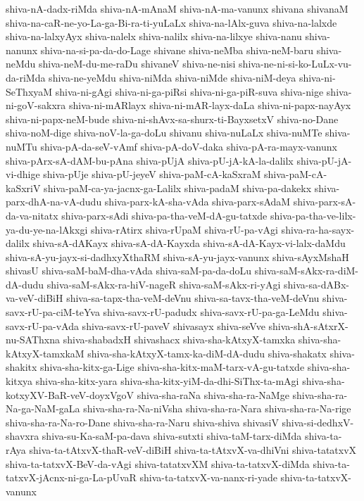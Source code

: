 {shiva-nA-dadx-riMda
shiva-nA-mAnaM
shiva-nA-ma-vanunx
shivana
shivanaM
shiva-na-caR-ne-yo-La-ga-Bi-ra-ti-yuLaLx
shiva-na-lAlx-guva
shiva-na-lalxde
shiva-na-lalxyAyx
shiva-nalelx
shiva-nalilx
shiva-na-lilxye
shiva-nanu
shiva-nanunx
shiva-na-si-pa-da-do-Lage
shivane
shiva-neMba
shiva-neM-baru
shiva-neMdu
shiva-neM-du-me-raDu
shivaneV
shiva-ne-nisi
shiva-ne-ni-si-ko-LuLx-vu-da-riMda
shiva-ne-yeMdu
shiva-niMda
shiva-niMde
shiva-niM-deya
shiva-ni-SeThxyaM
shiva-ni-gAgi
shiva-ni-ga-piRsi
shiva-ni-ga-piR-suva
shiva-nige
shiva-ni-goV-sakxra
shiva-ni-mARlayx
shiva-ni-mAR-layx-daLa
shiva-ni-papx-nayAyx
shiva-ni-papx-neM-bude
shiva-ni-shAvx-sa-shurx-ti-BayxsetxV
shiva-no-Dane
shiva-noM-dige
shiva-noV-la-ga-doLu
shivanu
shiva-nuLaLx
shiva-nuMTe
shiva-nuMTu
shiva-pA-da-seV-vAmf
shiva-pA-doV-daka
shiva-pA-ra-mayx-vanunx
shiva-pArx-sA-dAM-bu-pAna
shiva-pUjA
shiva-pU-jA-kA-la-dalilx
shiva-pU-jA-vi-dhige
shiva-pUje
shiva-pU-jeyeV
shiva-paM-cA-kaSxraM
shiva-paM-cA-kaSxriV
shiva-paM-ca-ya-jacnx-ga-Lalilx
shiva-padaM
shiva-pa-dakekx
shiva-parx-dhA-na-vA-dudu
shiva-parx-kA-sha-vAda
shiva-parx-sAdaM
shiva-parx-sA-da-va-nitatx
shiva-parx-sAdi
shiva-pa-tha-veM-dA-gu-tatxde
shiva-pa-tha-ve-lilx-ya-du-ye-na-lAkxgi
shiva-rAtirx
shiva-rUpaM
shiva-rU-pa-vAgi
shiva-ra-ha-sayx-dalilx
shiva-sA-dAKayx
shiva-sA-dA-Kayxda
shiva-sA-dA-Kayx-vi-lalx-daMdu
shiva-sA-yu-jayx-si-dadhxyXthaRM
shiva-sA-yu-jayx-vanunx
shiva-sAyxMshaH
shivasU
shiva-saM-baM-dha-vAda
shiva-saM-pa-da-doLu
shiva-saM-sAkx-ra-diM-dA-dudu
shiva-saM-sAkx-ra-hiV-nageR
shiva-saM-sAkx-ri-yAgi
shiva-sa-dABx-va-veV-diBiH
shiva-sa-tapx-tha-veM-deVnu
shiva-sa-tavx-tha-veM-deVnu
shiva-savx-rU-pa-ciM-teYva
shiva-savx-rU-padudx
shiva-savx-rU-pa-ga-LeMdu
shiva-savx-rU-pa-vAda
shiva-savx-rU-paveV
shivasayx
shiva-seVve
shiva-shA-sAtxrX-nu-SAThxna
shiva-shabadxH
shivashacx
shiva-sha-kAtxyX-tamxka
shiva-sha-kAtxyX-tamxkaM
shiva-sha-kAtxyX-tamx-ka-diM-dA-dudu
shiva-shakatx
shiva-shakitx
shiva-sha-kitx-ga-Lige
shiva-sha-kitx-maM-tarx-vA-gu-tatxde
shiva-sha-kitxya
shiva-sha-kitx-yara
shiva-sha-kitx-yiM-da-dhi-SiThx-ta-mAgi
shiva-sha-kotxyXV-BaR-veV-doyxVgoV
shiva-sha-raNa
shiva-sha-ra-NaMge
shiva-sha-ra-Na-ga-NaM-gaLa
shiva-sha-ra-Na-niVsha
shiva-sha-ra-Nara
shiva-sha-ra-Na-rige
shiva-sha-ra-Na-ro-Dane
shiva-sha-ra-Naru
shiva-shiva
shivasiV
shiva-si-dedhxV-shavxra
shiva-su-Ka-saM-pa-dava
shiva-sutxti
shiva-taM-tarx-diMda
shiva-ta-rAya
shiva-ta-tAtxvX-thaR-veV-diBiH
shiva-ta-tAtxvX-va-dhiVni
shiva-tatatxvX
shiva-ta-tatxvX-BeV-da-vAgi
shiva-tatatxvXM
shiva-ta-tatxvX-diMda
shiva-ta-tatxvX-jAcnx-ni-ga-La-pUvaR
shiva-ta-tatxvX-va-nanx-ri-yade
shiva-ta-tatxvX-vanunx
}

